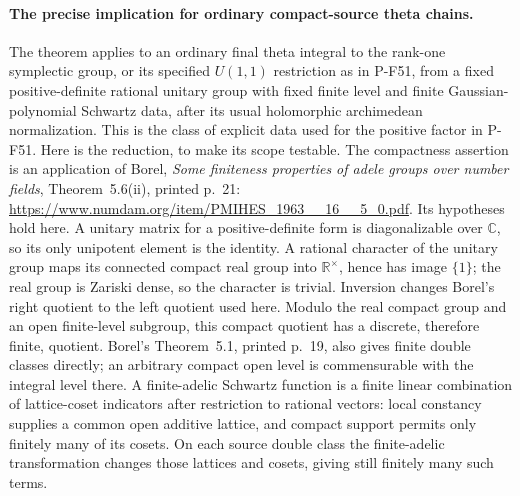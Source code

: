 \paragraph{The precise implication for ordinary compact-source theta chains.}
The theorem applies to an ordinary final theta integral to the
rank-one symplectic group, or its specified $U(1,1)$ restriction
as in P-F51, from a fixed positive-definite rational unitary group
with fixed finite level and
finite Gaussian-polynomial Schwartz data, after its usual holomorphic
archimedean normalization.  This is the class of explicit data used
for the positive factor in P-F51.  Here is the reduction, to make its
scope testable.  The compactness assertion is an application of
Borel, \emph{Some finiteness properties of adele groups over number
fields}, Theorem~5.6(ii), printed p.~21:
\url{https://www.numdam.org/item/PMIHES_1963__16__5_0.pdf}.
Its hypotheses hold here.  A unitary matrix for a positive-definite
form is diagonalizable over $\mathbb C$, so its only unipotent
element is the identity.  A rational character of the unitary group
maps its connected compact real group into $\mathbb R^\times$,
hence has image $\{1\}$; the real group is Zariski dense, so the
character is trivial.  Inversion changes Borel's right quotient
to the left quotient used here.  Modulo the real compact group and
an open finite-level subgroup, this compact quotient has a discrete,
therefore finite, quotient.  Borel's Theorem~5.1, printed p.~19,
also gives finite double classes directly; an arbitrary compact
open level is commensurable with the integral level there.
A finite-adelic
Schwartz function is a finite linear combination of lattice-coset
indicators after restriction to rational vectors: local constancy
supplies a common open additive lattice, and compact support permits
only finitely many of its cosets.  On each source double class the
finite-adelic transformation changes those lattices and cosets, giving
still finitely many such terms.

